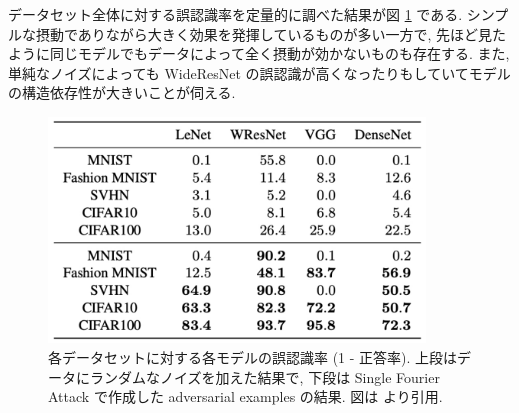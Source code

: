 データセット全体に対する誤認識率を定量的に調べた結果が図 \ref{fig:on-the-fool-ratio} である.
シンプルな摂動でありながら大きく効果を発揮しているものが多い一方で, 先ほど見たように同じモデルでもデータによって全く摂動が効かないものも存在する.
また, 単純なノイズによっても WideResNet の誤認識が高くなったりもしていてモデルの構造依存性が大きいことが伺える.
%
\begin{figure}[htbp]
\begin{center}
\includegraphics[width=10.0cm]{figures/on-the-fool-ratio.pdf}
\end{center}
\caption{
各データセットに対する各モデルの誤認識率 (1 - 正答率).
上段はデータにランダムなノイズを加えた結果で, 下段は Single Fourier Attack で作成した adversarial examples の結果.
図は \cite{tsuzuku2019structural} より引用.
}
\label{fig:on-the-fool-ratio}
\end{figure}
%

